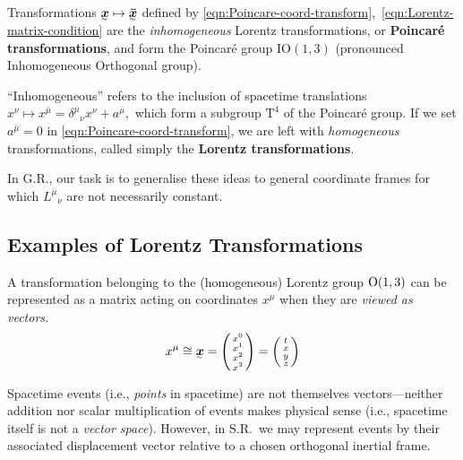 Transformations $\ts x \mapsto \ts{\bar x}$ defined by \eqref{eqn:Poincare-coord-transform},~\eqref{eqn:Lorentz-matrix-condition} are the \textit{inhomogeneous} Lorentz transformations, or \textbf{Poincaré transformations}, and form the Poincaré group $\mathrm{IO}(1,3)$ (pronounced Inhomogeneous Orthogonal group).



\begin{wrapfigure}[8]{r}{5cm}
	\vspace*{-\baselineskip}
	
\end{wrapfigure}

``Inhomogeneous'' refers to the inclusion of spacetime translations
\begin{math}
	x^\nu \mapsto x^{\bar\mu} = \delta^{\bar\mu}{}_\nu x^\nu + a^{\bar\mu}
,\end{math}
which form a subgroup $\mathrm{T}^4$ of the Poincaré group.
If we set $a^{\bar\mu} = 0$ in \eqref{eqn:Poincare-coord-transform}, we are left with \textit{homogeneous} transformations, called simply the \textbf{Lorentz transformations}.


In G.R., our task is to generalise these ideas to general coordinate frames for which $L^{\bar\mu}{}_\nu$ are not necessarily constant.


\subsection{Examples of Lorentz Transformations}

A transformation belonging to the (homogeneous) Lorentz group $\mathrm{O}(1,3)$ can be represented as a matrix acting on coordinates $x^\mu$ when they are \emph{viewed as vectors.}
\begin{align}
	x^\mu \cong \ts{x} = \smqty(x^0 \\ x^1 \\ x^2 \\ x^3)
	= \smqty(t \\ x \\ y \\ z)
\end{align}

\begin{note}
	Spacetime events (i.e., \textit{points} in spacetime) are not themselves vectors---neither addition nor scalar multiplication of events makes physical sense (i.e., spacetime itself is not a \textit{vector space}).
	However, in S.R.\ we may represent events by their associated displacement vector relative to a chosen orthogonal inertial frame.
\end{note}

